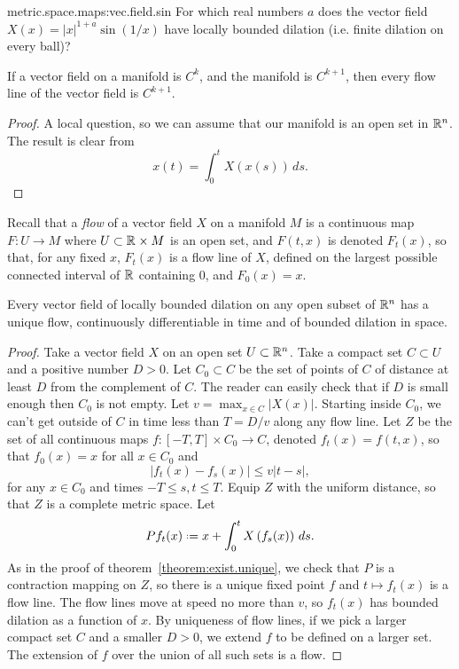 \endgroup %
\begin{problem}{metric.space.maps:vec.field.sin}
For which real numbers \(a\) does the vector field \(X(x)=|x|^{1+a} \sin(1/x)\) have locally bounded dilation (i.e. finite dilation on every ball)?
\end{problem}
\begin{theorem}
If a vector field on a manifold is \(C^k\), and the manifold is \(C^{k+1}\), then every flow line of the vector field is \(C^{k+1}\).
\end{theorem}
\begin{proof}
A local question, so we can assume that our manifold is an open set in \(\mathbb{R}^{n}\).
The result is clear from
\[
x(t)=\int_0^t X(x(s)) \, ds.
\]
\end{proof}
Recall that a \emph{flow} of a vector field \(X\) on a manifold \(M\) is a continuous map \(F \colon U \to M\) where \(U \subset \mathbb{R}^{} \times M\) is an open set, and \(F(t,x)\) is denoted \(F_t(x)\), so that, for any fixed \(x\), \(F_t(x)\) is a flow line of \(X\), defined on the largest possible connected interval of \(\mathbb{R}^{}\) containing \(0\), and \(F_0(x)=x\).
\begin{theorem}\label{theorem:Picard.Lipschitz}
Every vector field of locally bounded dilation on any open subset of \(\mathbb{R}^{n}\) has a unique flow, continuously differentiable in time and of bounded dilation in space.
\end{theorem}
\begin{proof}
Take a vector field \(X\) on an open set \(U \subset \mathbb{R}^{n}\).
Take a compact set \(C \subset U\) and a positive number \(D>0\).
Let \(C_0 \subset C\) be the set of points of \(C\) of distance at least \(D\) from the complement of \(C\).
The reader can easily check that if \(D\) is small enough then \(C_0\) is not empty.
Let \(v=\max_{x \in C} |X(x)|\).
Starting inside \(C_0\), we can't get outside of \(C\) in time less than \(T=D/v\) along any flow line.
Let \(Z\) be the set of all continuous maps \(f \colon \left[-T,T\right] \times C_0 \to C\), denoted \(f_t(x)=f(t,x)\), so that \(f_0(x)=x\) for all \(x \in C_0\) and
\[
\left|f_t(x)-f_s(x)\right|\le v\left|t-s\right|,
\]
for any \(x \in C_0\) and times \(-T \le s, t \le T\).
Equip \(Z\) with the uniform distance, so that \(Z\) is a complete metric space.
Let
\[
Pf_t(x) \defeq x+\int_0^t X\of{f_s(x)} \, ds.
\]
As in the proof of theorem~\vref{theorem:exist.unique}, we check that \(P\) is a contraction mapping on \(Z\), so there is a unique fixed point \(f\) and \(t \mapsto f_t(x)\) is a flow line.
The flow lines move at speed no more than \(v\), so \(f_t(x)\) has bounded dilation as a function of \(x\).
By uniqueness of flow lines, if we pick a larger compact set \(C\) and a smaller \(D>0\), we extend \(f\) to be defined on a larger set.
The extension of \(f\) over the union of all such sets is a flow.
\end{proof}
